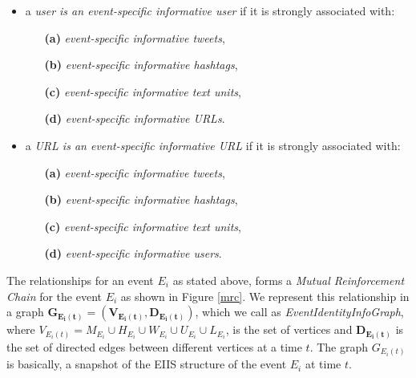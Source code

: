 \begin{itemize} 
\item a \textit{user is an event-specific informative user} if it is strongly associated with:
\begin{itemize}
\item[\textbf{(a)}] \textit{event-specific informative tweets}, 
\item[\textbf{(b)}] \textit{event-specific informative hashtags}, 
\item[\textbf{(c)}] \textit{event-specific informative text units},
\item[\textbf{(d)}] \textit{event-specific informative URLs}. 
\end{itemize}
\end{itemize}

\begin{itemize} \item a \textit{URL is an event-specific informative URL} if it is strongly associated with:
\begin{itemize}
\item[\textbf{(a)}] \textit{event-specific informative tweets}, 
\item[\textbf{(b)}] \textit{event-specific informative hashtags}, 
\item[\textbf{(c)}] \textit{event-specific informative text units},
\item[\textbf{(d)}] \textit{event-specific informative users}. 
\end{itemize}
\end{itemize}


The relationships for an event $E_{i}$ as stated above, forms a \textit{Mutual Reinforcement Chain} \cite{wei2008query} for the event $E_{i}$ as shown in Figure \ref{mrc}. We represent this relationship in a graph $\mathbf{G_{E_{i}(t)} = (V_{E_{i}(t)},D_{E_{i}(t)})}$, which we call as \textit{EventIdentityInfoGraph}, where $V_{E_{i}(t)} = M_{E_{i}} \cup H_{E_{i}} \cup W_{E_{i}} \cup U_{E_{i}} \cup L_{E_{i}}$, is the set of vertices and $\mathbf{D_{E_{i}(t)}}$ is the set of directed edges between different vertices at a time $t$. The graph $G_{E_{i}(t)}$ is basically, a snapshot of the EIIS structure of the event $E_{i}$ at time $t$. 

